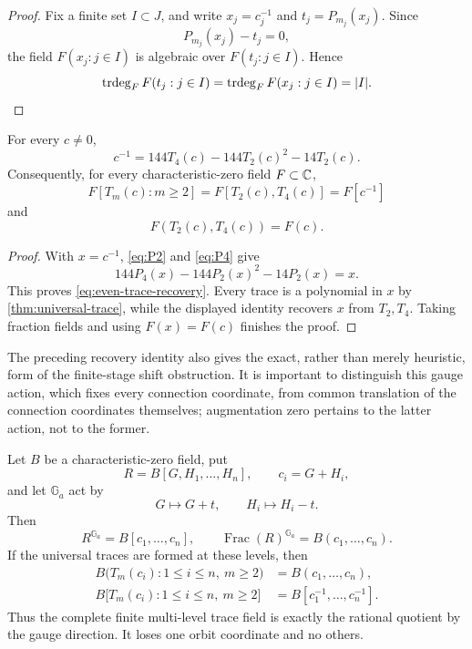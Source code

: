 \begin{proof}
Fix a finite set \(I\subset J\), and write
\(x_j=c_j^{-1}\) and \(t_j=P_{m_j}(x_j)\).  Since
\[
 P_{m_j}(x_j)-t_j=0,
\]
the field \(F(x_j:j\in I)\) is algebraic over \(F(t_j:j\in I)\).  Hence
\[
 \operatorname{trdeg}_FF(t_j:j\in I)
 =\operatorname{trdeg}_FF(x_j:j\in I)=|I|.
\]
\end{proof}

\begin{theorem}
\label{cor:fixed-level-closure}
For every \(c\ne0\),
\begin{equation}\label{eq:even-trace-recovery}
 \boxed{\displaystyle
 c^{-1}=144T_4(c)-144T_2(c)^2-14T_2(c).}
\end{equation}
Consequently, for every characteristic-zero field \(F\subset\mathbb C\),
\[
 \boxed{\displaystyle
 F[T_m(c):m\ge2]
 =F[T_2(c),T_4(c)]
 =F[c^{-1}]}
\]
and
\[
 \boxed{F(T_2(c),T_4(c))=F(c).}
\]
\end{theorem}

\begin{proof}
With \(x=c^{-1}\), \eqref{eq:P2} and \eqref{eq:P4} give
\[
 144P_4(x)-144P_2(x)^2-14P_2(x)=x.
\]
This proves \eqref{eq:even-trace-recovery}.  Every trace is a polynomial in
\(x\) by \cref{thm:universal-trace}, while the displayed identity recovers
\(x\) from \(T_2,T_4\).  Taking fraction fields and using \(F(x)=F(c)\)
finishes the proof.
\end{proof}

The preceding recovery identity also gives the exact, rather than merely
heuristic, form of the finite-stage shift obstruction.  It is important to
distinguish this gauge action, which fixes every connection coordinate,
from common translation of the connection coordinates themselves;
augmentation zero pertains to the latter action, not to the former.

\begin{theorem}
\label{thm:exact-shift-quotient}
Let \(B\) be a characteristic-zero field, put
\[
 R=B[G,H_1,\ldots,H_n],\qquad c_i=G+H_i,
\]
and let \(\mathbb G_a\) act by
\begin{equation}\label{eq:gauge-action}
 G\longmapsto G+t,\qquad H_i\longmapsto H_i-t.
\end{equation}
Then
\begin{equation}\label{eq:shift-invariant-ring}
 \boxed{R^{\mathbb G_a}=B[c_1,\ldots,c_n],\qquad
 \operatorname{Frac}(R)^{\mathbb G_a}=B(c_1,\ldots,c_n).}
\end{equation}
If the universal traces are formed at these levels, then
\begin{align}
 B\bigl(T_m(c_i):1\le i\le n,\ m\ge2\bigr)
 &=B(c_1,\ldots,c_n),\label{eq:trace-invariant-field}\\
 B\bigl[T_m(c_i):1\le i\le n,\ m\ge2\bigr]
 &=B[c_1^{-1},\ldots,c_n^{-1}].\label{eq:trace-invariant-ring}
\end{align}
Thus the complete finite multi-level trace field is exactly the rational
quotient by the gauge direction.  It loses one orbit coordinate and no
others.
\end{theorem}

